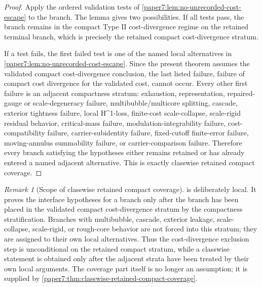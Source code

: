 \documentclass[11pt]{amsart}
\def\({}%
\def\){}%
\theoremstyle{plain}
\theoremstyle{definition}
\theoremstyle{remark}
\newtheorem{remark}[remark]{Remark}
\begin{document}
\begin{proof}
Apply the ordered validation tests of
\cref{paper7:lem:no-unrecorded-cost-escape} to the branch.  The lemma gives two
possibilities.  If all tests pass, the branch remains in the compact Type II
cost-divergence regime on the retained terminal branch, which is precisely the
retained compact cost-divergence stratum.
\par
If a test fails, the first failed test is one of the named local alternatives in
\cref{paper7:lem:no-unrecorded-cost-escape}.  Since the present theorem assumes
the validated compact cost-divergence conclusion, the last listed failure,
failure of compact cost divergence for the validated cost, cannot occur.  Every
other first failure is an adjacent compactness stratum: exhaustion,
representation, repaired-gauge or scale-degeneracy failure,
multibubble/multicore splitting, cascade, exterior tightness failure, local
\(H^1\)-loss, finite-cost scale-collapse, scale-rigid residual behavior,
critical-mass failure, modulation-integrability failure, cost-compatibility
failure, carrier-subidentity failure, fixed-cutoff finite-error failure,
moving-annulus summability failure, or carrier-comparison failure.  Therefore
every branch satisfying the hypotheses either remains retained or has already
entered a named adjacent alternative.  This is exactly classwise retained
compact coverage.
\end{proof}

\begin{remark}[Scope of classwise retained compact coverage]
\label{paper7:rem:uniform-cost-scope}
 is deliberately local.
It proves the interface hypotheses for a branch only after the branch has been
placed in the validated compact cost-divergence stratum by the compactness
stratification.  Branches with multibubble, cascade, exterior leakage,
scale-collapse, scale-rigid, or rough-core behavior are not forced into this
stratum; they are assigned to their own local alternatives.  Thus the
cost-divergence exclusion step is unconditional on the retained compact
stratum, while a classwise statement is obtained only after the adjacent
strata have been treated by their own local arguments.  The coverage part itself
is no longer an assumption; it is supplied by
\cref{paper7:thm:classwise-retained-compact-coverage}.
\end{remark}
\end{document}
